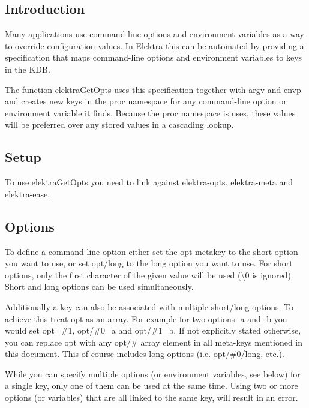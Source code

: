 \subsection*{Introduction}

Many applications use command-\/line options and environment variables as a way to override configuration values. In Elektra this can be automated by providing a specification that maps command-\/line options and environment variables to keys in the K\+DB.

The function {\ttfamily elektra\+Get\+Opts} uses this specification together with {\ttfamily argv} and {\ttfamily envp} and creates new keys in the {\ttfamily proc} namespace for any command-\/line option or environment variable it finds. Because the {\ttfamily proc} namespace is uses, these values will be preferred over any stored values in a cascading lookup.

\subsection*{Setup}

To use {\ttfamily elektra\+Get\+Opts} you need to link against {\ttfamily elektra-\/opts}, {\ttfamily elektra-\/meta} and {\ttfamily elektra-\/ease}.

\subsection*{Options}

To define a command-\/line option either set the {\ttfamily opt} metakey to the short option you want to use, or set {\ttfamily opt/long} to the long option you want to use. For short options, only the first character of the given value will be used (\textquotesingle{}\textbackslash{}0\textquotesingle{} is ignored). Short and long options can be used simultaneously.

Additionally a key can also be associated with multiple short/long options. To achieve this treat {\ttfamily opt} as an array. For example for two options {\ttfamily -\/a} and {\ttfamily -\/b} you would set {\ttfamily opt=\#1}, {\ttfamily opt/\#0=a} and {\ttfamily opt/\#1=b}. If not explicitly stated otherwise, you can replace {\ttfamily opt} with any {\ttfamily opt/\#} array element in all meta-\/keys mentioned in this document. This of course includes long options (i.\+e. {\ttfamily opt/\#0/long}, etc.).

While you can specify multiple options (or environment variables, see below) for a single key, only one of them can be used at the same time. Using two or more options (or variables) that are all linked to the same key, will result in an error.


